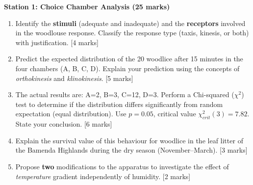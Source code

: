 \documentclass[11pt]{article}
\newcounter{popsec}
\newcounter{popsub}
\newcommand{\courssub}[1]{%
  \stepcounter{popsub}%
  \par\vspace{9pt}\noindent{\popxbold\fontsize{11.5}{13}\selectfont\color{popink}{\color{poporange}\thepopsec.\thepopsub}\hspace{6pt}#1}\par\nopagebreak\vspace{4pt}
}
\begin{document}
\courssub{Tasks}

\textbf{Station 1: Choice Chamber Analysis (25 marks)}
\begin{enumerate}
    \item Identify the \textbf{stimuli} (adequate and inadequate) and the \textbf{receptors} involved in the woodlouse response. Classify the response type (taxis, kinesis, or both) with justification. [4 marks]
    \item Predict the expected distribution of the 20 woodlice after 15 minutes in the four chambers (A, B, C, D). Explain your prediction using the concepts of \emph{orthokinesis} and \emph{klinokinesis}. [5 marks]
    \item The actual results are: A=2, B=3, C=12, D=3. Perform a Chi-squared ($\chi^2$) test to determine if the distribution differs significantly from random expectation (equal distribution). Use $p=0.05$, critical value $\chi^2_{crit}(3)=7.82$. State your conclusion. [6 marks]
    \item Explain the survival value of this behaviour for woodlice in the leaf litter of the Bamenda Highlands during the dry season (November--March). [3 marks]
    \item Propose \textbf{two} modifications to the apparatus to investigate the effect of \emph{temperature} gradient independently of humidity. [2 marks]
\end{enumerate}
\end{document}
